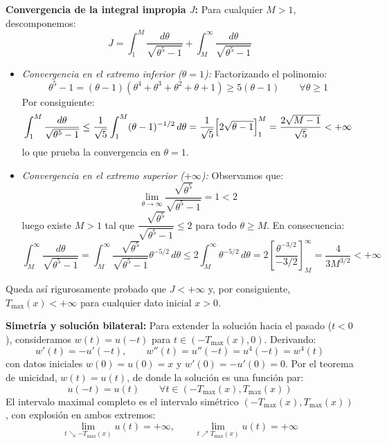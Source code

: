 {    \textbf{Convergencia de la integral impropia $J$:} Para cualquier $M > 1$, descomponemos:
    \[
        J = \int_1^M \frac{d\theta}{\sqrt{\theta^5 - 1}} + \int_M^\infty \frac{d\theta}{\sqrt{\theta^5 - 1}}
    \]
    \begin{itemize}
        \item \textit{Convergencia en el extremo inferior ($\theta = 1$):} Factorizando el polinomio:
        \[
            \theta^5 - 1 = (\theta - 1)(\theta^4 + \theta^3 + \theta^2 + \theta + 1) \geq 5(\theta - 1) \qquad \forall \theta \geq 1
        \]
        Por consiguiente:
        \[
            \int_1^M \frac{d\theta}{\sqrt{\theta^5 - 1}} \leq \frac{1}{\sqrt{5}} \int_1^M (\theta - 1)^{-1/2}\, d\theta = \frac{1}{\sqrt{5}} \Bigl[ 2\sqrt{\theta - 1} \Bigr]_1^M = \frac{2\sqrt{M - 1}}{\sqrt{5}} < +\infty
        \]
        lo que prueba la convergencia en $\theta = 1$.
        \item \textit{Convergencia en el extremo superior ($+\infty$):} Observamos que:
        \[
            \lim_{\theta \to \infty} \frac{\sqrt{\theta^5}}{\sqrt{\theta^5 - 1}} = 1 < 2
        \]
        luego existe $M > 1$ tal que $\dfrac{\sqrt{\theta^5}}{\sqrt{\theta^5 - 1}} \leq 2$ para todo $\theta \geq M$. En consecuencia:
        \[
            \int_M^\infty \frac{d\theta}{\sqrt{\theta^5 - 1}} = \int_M^\infty \frac{\sqrt{\theta^5}}{\sqrt{\theta^5 - 1}} \theta^{-5/2}\, d\theta \leq 2 \int_M^\infty \theta^{-5/2}\, d\theta = 2 \left[ \frac{\theta^{-3/2}}{-3/2} \right]_M^\infty = \frac{4}{3 M^{3/2}} < +\infty
        \]
    \end{itemize}
    Queda así rigurosamente probado que $J < +\infty$ y, por consiguiente, $T_{\max}(x) < +\infty$ para cualquier dato inicial $x > 0$.

    \medskip

    \textbf{Simetría y solución bilateral:} Para extender la solución hacia el pasado ($t < 0$), consideramos $w(t) = u(-t)$ para $t \in (-T_{\max}(x), 0)$. Derivando:
    \[
        w'(t) = -u'(-t), \qquad w''(t) = u''(-t) = u^4(-t) = w^4(t)
    \]
    con datos iniciales $w(0) = u(0) = x$ y $w'(0) = -u'(0) = 0$. Por el teorema de unicidad, $w(t) = u(t)$, de donde la solución es una función par:
    \[
        u(-t) = u(t) \qquad \forall t \in (-T_{\max}(x), T_{\max}(x))
    \]
    El intervalo maximal completo es el intervalo simétrico $(-T_{\max}(x), T_{\max}(x))$, con explosión en ambos extremos:
    \[
        \lim_{t \searrow -T_{\max}(x)} u(t) = +\infty, \qquad \lim_{t \nearrow T_{\max}(x)} u(t) = +\infty
    \]
    \medskip

}

